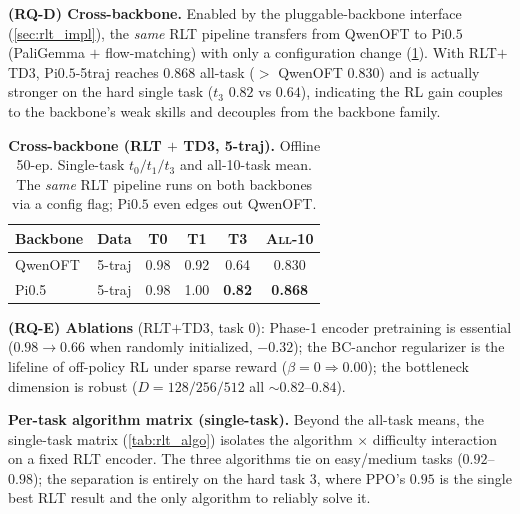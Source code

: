 \documentclass[11pt]{article}
\begin{document}
\textbf{(RQ-D) Cross-backbone.} Enabled by the pluggable-backbone interface (\cref{sec:rlt_impl}), the \emph{same} RLT pipeline transfers from QwenOFT to Pi$0.5$ (PaliGemma $+$ flow-matching) with only a configuration change (\cref{tab:rlt_backbone}). With RLT$+$TD3, Pi$0.5$-5traj reaches $0.868$ all-task ($>$ QwenOFT $0.830$) and is actually stronger on the hard single task ($t_3$ $0.82$ vs $0.64$), indicating the RL gain couples to the backbone's weak skills and decouples from the backbone family.

\begin{table}[t]
    \centering
    \caption{\textbf{Cross-backbone (RLT $+$ TD3, 5-traj).} Offline 50-ep. Single-task $t_0/t_1/t_3$ and all-10-task mean. The \emph{same} RLT pipeline runs on both backbones via a config flag; Pi$0.5$ even edges out QwenOFT.}
    \label{tab:rlt_backbone}
    \vspace{0.3em}
    \footnotesize
    \setlength{\tabcolsep}{7pt}
    \renewcommand{\arraystretch}{1.15}
    \begin{tabular}{@{}l l ccc c@{}}
        \toprule
        \textbf{Backbone} & \textbf{Data} & \textsc{T0} & \textsc{T1} & \textsc{T3} & \textsc{All-10} \\
        \midrule
        QwenOFT & 5-traj & 0.98 & 0.92 & 0.64 & 0.830 \\
        Pi0.5   & 5-traj & 0.98 & 1.00 & \textbf{0.82} & \textbf{0.868} \\
        \bottomrule
    \end{tabular}
\end{table}

\textbf{(RQ-E) Ablations} (RLT$+$TD3, task $0$): Phase-1 encoder pretraining is essential ($0.98\!\to\!0.66$ when randomly initialized, $-0.32$); the BC-anchor regularizer is the lifeline of off-policy RL under sparse reward ($\beta{=}0\!\Rightarrow\!0.00$); the bottleneck dimension is robust ($D{=}128/256/512$ all ${\sim}0.82$--$0.84$).

\textbf{Per-task algorithm matrix (single-task).} Beyond the all-task means, the single-task matrix (\cref{tab:rlt_algo}) isolates the algorithm $\times$ difficulty interaction on a fixed RLT encoder. The three algorithms tie on easy/medium tasks ($0.92$--$0.98$); the separation is entirely on the hard task $3$, where PPO's $0.95$ is the single best RLT result and the only algorithm to reliably solve it.
\end{document}
